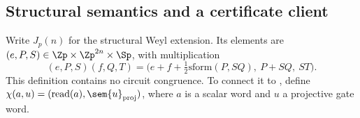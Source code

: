 \begin{code}[hide]
\AgdaSpace{}%
\<%
\\
\>[0]\AgdaSpace{}%
\AgdaSpace{}%
\AgdaSpace{}%
\<%
\\
\>[0]\AgdaSpace{}%
\<%
\\
\>[0][@{}l@{\AgdaIndent{0}}]%
\>[2]\AgdaSpace{}%
\AgdaSpace{}%
\AgdaSpace{}%
\AgdaSpace{}%
\AgdaSpace{}%
\<%
\\
\>[0]\AgdaSpace{}%
\<%
\\
\>[0][@{}l@{\AgdaIndent{0}}]%
\>[2]\AgdaSpace{}%
\AgdaSpace{}%
\AgdaSpace{}%
\AgdaSpace{}%
\AgdaSpace{}%
\<%
\\
%
\\[\AgdaEmptyExtraSkip]%
\>[0]\AgdaSpace{}%
\AgdaSpace{}%
\AgdaSymbol{=}\AgdaSpace{}%
\AgdaSpace{}%
\<%
\\
\>[0]\AgdaSpace{}%
\AgdaSpace{}%
\AgdaSpace{}%
\AgdaSymbol{(}\AgdaSymbol{)}\<%
\\
\>[0]\AgdaSpace{}%
\AgdaSpace{}%
\AgdaSpace{}%
\AgdaSymbol{(}\AgdaSymbol{)}\<%
\\
\>[0]\AgdaSpace{}%
\AgdaSpace{}%
\AgdaSpace{}%
\AgdaSymbol{(}\AgdaSymbol{)}\<%
\end{code}
\subsection{Structural semantics and a certificate client}\label{sec:structural}

Write $J_p(n)$ for the structural Weyl extension. Its elements are
$(e,P,S)\in\Zp\times\Zp^{2n}\times\Sp$, with multiplication
\[
(e,P,S)(f,Q,T)=
\bigl(e+f+\tfrac12\mathrm{sform}(P,SQ),\ P+SQ,\ ST\bigr).
\]
This definition contains no circuit congruence. To connect it to
, define $\chi(a,u)=(\mathrm{read}(a),\sem{u}_{\rm proj})$,
where $a$ is a scalar word and $u$ a projective gate word.

